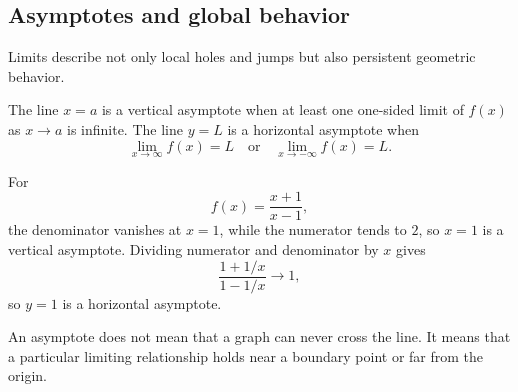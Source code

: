 \subsection{Asymptotes and global behavior}

Limits describe not only local holes and jumps but also persistent geometric behavior.

\begin{definitionbox}
The line \(x=a\) is a vertical asymptote when at least one one-sided limit of \(f(x)\) as \(x\to a\) is infinite. The line \(y=L\) is a horizontal asymptote when
\[
\lim_{x\to\infty}f(x)=L
\quad\text{or}\quad
\lim_{x\to-\infty}f(x)=L.
\]
\end{definitionbox}

\begin{examplebox}
For
\[
f(x)=\frac{x+1}{x-1},
\]
the denominator vanishes at \(x=1\), while the numerator tends to \(2\), so \(x=1\) is a vertical asymptote. Dividing numerator and denominator by \(x\) gives
\[
\frac{1+1/x}{1-1/x}\to1,
\]
so \(y=1\) is a horizontal asymptote.
\end{examplebox}

\begin{interpretationbox}
An asymptote does not mean that a graph can never cross the line. It means that a particular limiting relationship holds near a boundary point or far from the origin.
\end{interpretationbox}
